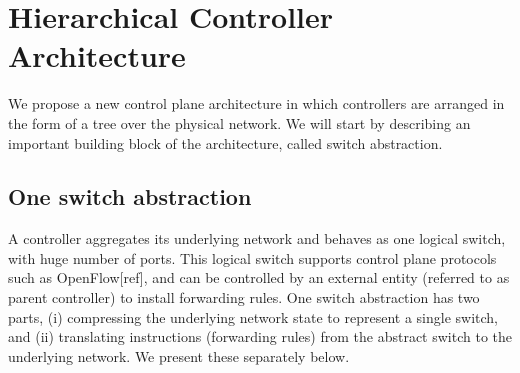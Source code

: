 \documentclass[10pt, twocolumn]{article}
\begin{document}
\section{Hierarchical Controller Architecture}
\label{sec:hierarchical}
We propose a new control plane architecture in which controllers are arranged in the form of a tree over the physical network. We will start by describing an important building block of the architecture, called switch abstraction.

\subsection{One switch abstraction}
\label{subsec:aggr}
A controller aggregates its underlying network and behaves as one logical switch, with huge number of ports. This logical switch supports control plane protocols such as OpenFlow[ref], and can be controlled by an external entity (referred to as parent controller) to install forwarding rules. One switch abstraction has two parts, (i) compressing the underlying network state to represent a single switch, and (ii) translating instructions (forwarding rules) from the abstract switch to the underlying network. We present these separately below.
\end{document}
